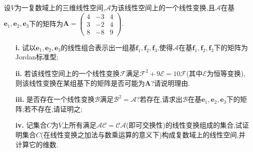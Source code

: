 \documentclass[a4paper]{article}
\newcommand\bsy{\boldsymbol}
\begin{document}
\begin{spacing}{1.5}
设$V$为一复数域上的三维线性空间,$\mathscr{A}$为该线性空间上的一个线性变换,且$\mathscr{A}$在基$\bsy{e}_1,\bsy{e}_2,\bsy{e}_3$下的矩阵为$\bsy{A} = \begin{pmatrix}4&-3&4\\3&-2&4\\8&-8&9\end{pmatrix}.$
\begin{enumerate}
        \item[\textbf{i.}] 试以$\bsy{e}_1,\bsy{e}_2,\bsy{e}_3$的线性组合表示出一组基$\bsy{f}_1,\bsy{f}_2,\bsy{f}_3$,使得$\mathscr{A}$在基$\bsy{f}_1,\bsy{f}_2,\bsy{f}_3$下的矩阵为Jordan标准型;
        \item[\textbf{ii.}]若该线性空间上的一个线性变换$\mathscr{F}$满足$\mathscr{F}^2+9\mathscr{E}=10\mathscr{F}$(其中$\mathscr{E}$为恒等变换),则该线性变换在某组基下的矩阵是否可能为$\bsy{A}$?请说明理由.
        \item[\textbf{iii.}]是否存在一个线性变换$\mathscr{B}$满足$\mathscr{B}^2=\mathscr{A}$?若存在,请求出$\mathscr{B}$在基$\bsy{e}_1,\bsy{e}_2,\bsy{e}_3$下的矩阵;若不存在,请证明之;
        \item[\textbf{iv.}]记集合$C$为$V$上所有满足$\mathscr{AC}=\mathscr{CA}$(即可交换性)的线性变换组成的集合,试证明集合$C$(在线性变换之加法与数乘运算的意义下)构成复数域上的线性空间,并计算它的维数.
    \end{enumerate}






\vspace{15mm}







\end{spacing}
\end{document}
